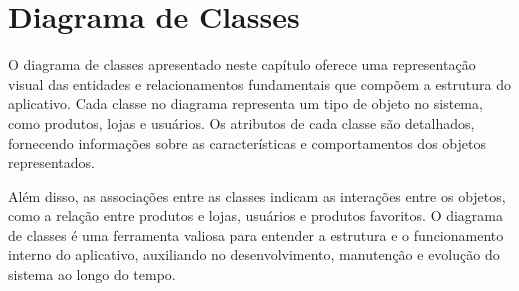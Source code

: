 \chapter{Diagrama de Classes} \label{cha:diagramaclasses}

O diagrama de classes apresentado neste capítulo oferece uma representação visual das entidades e relacionamentos fundamentais que compõem a estrutura do aplicativo. Cada classe no diagrama representa um tipo de objeto no sistema, como produtos, lojas e usuários. Os atributos de cada classe são detalhados, fornecendo informações sobre as características e comportamentos dos objetos representados. 

Além disso, as associações entre as classes indicam as interações entre os objetos, como a relação entre produtos e lojas, usuários e produtos favoritos. O diagrama de classes é uma ferramenta valiosa para entender a estrutura e o funcionamento interno do aplicativo, auxiliando no desenvolvimento, manutenção e evolução do sistema ao longo do tempo.




